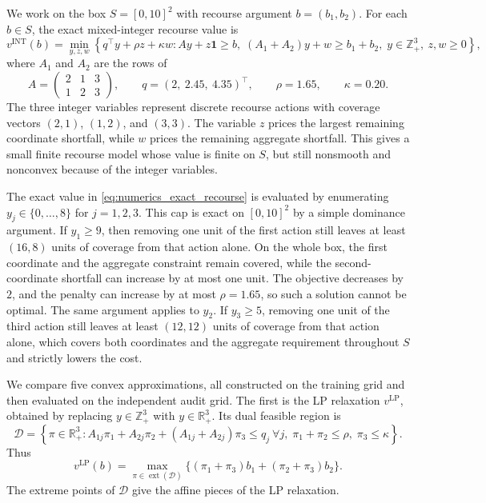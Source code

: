 \documentclass[11pt,letterpaper]{article}
\theoremstyle{definition}
\theoremstyle{remark}
\newcommand{\INT}{\mathrm{INT}}
\newcommand{\LP}{\mathrm{LP}}
\begin{document}
We work on the box $S=[0,10]^2$ with recourse argument $b=(b_1,b_2)$. For
each $b\in S$, the exact mixed-integer recourse value is
\begin{equation}
\label{eq:numerics_exact_recourse}
v^{\INT}(b)
=
\min_{y,z,w}
\left\{
q^\top y+\rho z+\kappa w:
Ay+z\mathbf 1\ge b,\;
(A_1+A_2)y+w\ge b_1+b_2,\;
y\in\mathbb Z_+^3,\ z,w\ge0
\right\},
\end{equation}
where $A_1$ and $A_2$ are the rows of
$$
A=
\begin{pmatrix}
2&1&3\\
1&2&3
\end{pmatrix},
\qquad
q=(2,\ 2.45,\ 4.35)^\top,
\qquad
\rho=1.65,
\qquad
\kappa=0.20.
$$
The three integer variables represent discrete recourse actions with coverage
vectors $(2,1)$, $(1,2)$, and $(3,3)$. The variable $z$ prices the largest
remaining coordinate shortfall, while $w$ prices the remaining aggregate
shortfall. This gives a small finite recourse model whose value is finite on
$S$, but still nonsmooth and nonconvex because of the integer variables.

The exact value in \eqref{eq:numerics_exact_recourse} is evaluated by
enumerating $y_j\in\{0,\ldots,8\}$ for $j=1,2,3$. This cap is exact on
$[0,10]^2$ by a simple dominance argument. If $y_1\ge9$, then removing one unit
of the first action still leaves at least $(16,8)$ units of coverage from that
action alone. On the whole box, the first coordinate and the aggregate
constraint remain covered, while the second-coordinate shortfall can increase
by at most one unit. The objective decreases by $2$, and the penalty can
increase by at most $\rho=1.65$, so such a solution cannot be optimal. The same
argument applies to $y_2$. If $y_3\ge5$, removing one unit of the third action
still leaves at least $(12,12)$ units of coverage from that action alone,
which covers both coordinates and the aggregate requirement throughout $S$ and
strictly lowers the cost.

We compare five convex approximations, all constructed on the training grid and
then evaluated on the independent audit grid. The first is the LP relaxation
$v^{\LP}$, obtained by replacing $y\in\mathbb Z_+^3$ with
$y\in\mathbb R_+^3$. Its dual feasible region is
$$
\mathcal D
=
\left\{
\pi\in\mathbb R_+^3:
A_{1j}\pi_1+A_{2j}\pi_2+(A_{1j}+A_{2j})\pi_3\le q_j\ \forall j,\;
\pi_1+\pi_2\le\rho,\;
\pi_3\le\kappa
\right\}.
$$
Thus
\begin{equation}
\label{eq:numerics_lp_dual}
v^{\LP}(b)
=
\max_{\pi\in\operatorname{ext}(\mathcal D)}
\{(\pi_1+\pi_3)b_1+(\pi_2+\pi_3)b_2\}.
\end{equation}
The extreme points of $\mathcal D$ give the affine pieces of the LP relaxation.
\end{document}
